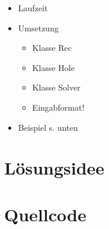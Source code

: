 \documentclass[a4paper,10pt,ngerman]{scrartcl}
\begin{document}
{\begin{itemize}
\begin{itemize}
\begin{itemize}
        \item was und wann kann nicht verbessert werden? (Beispiel 4: 7370) \checkmark
      \end{itemize}      
    \end{itemize}
    \item Laufzeit
    \item Umsetzung
      \begin{itemize}
        \item Klasse Rec
        \item Klasse Hole
        \item Klasse Solver
        \item Eingabformat!
      \end{itemize}
    \item Beispiel s. unten
  \end{itemize}
}

\section{Lösungsidee}












\printbibliography





\section{Quellcode}

\end{document}
